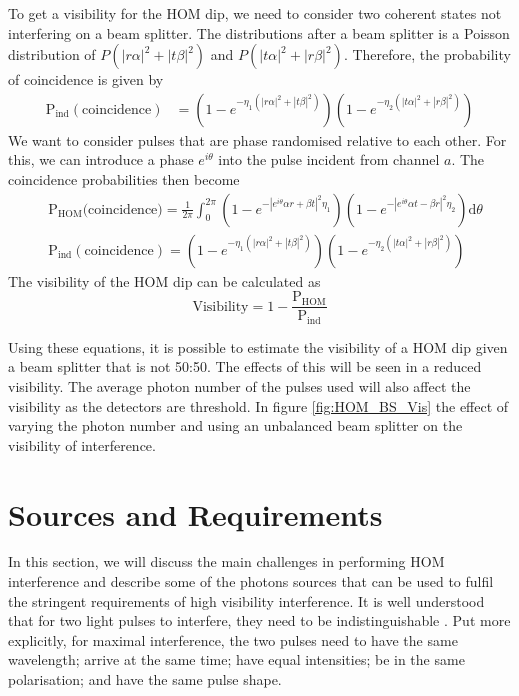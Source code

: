 To get a visibility for the HOM dip, we need to consider two coherent states not interfering on a beam splitter. The distributions after a beam splitter is a Poisson distribution of $P(|r\alpha|^2 + |t\beta|^2)$ and $P(|t\alpha|^2 + |r\beta|^2)$. Therefore, the probability of coincidence is given by
\begin{align}
	\text{P}_\text{ind}(\text{coincidence}) &= \left(1 - e^{-\eta_1(|r\alpha|^2 + |t\beta|^2)}\right)\left(1 - e^{-\eta_2(|t\alpha|^2 + |r\beta|^2)}\right)
\end{align}
We want to consider pulses that are phase randomised relative to each other. For this, we can introduce a phase $e^{i\theta}$ into the pulse incident from channel $a$. The coincidence probabilities then become
\begin{align}
	&\text{P}_\text{HOM}\text{(coincidence)} = \frac{1}{2\pi}\int_0^{2\pi}\left(1 - e^{-|e^{i\theta}\alpha r + \beta t|^2 \eta_1}\right)\left(1 - e^{-|e^{i\theta}\alpha t - \beta r|^2 \eta_2}\right)\text{d}\theta\\
	&\text{P}_\text{ind}(\text{coincidence}) = \left(1 - e^{-\eta_1(|r\alpha|^2 + |t\beta|^2)}\right)\left(1 - e^{-\eta_2(|t\alpha|^2 + |r\beta|^2)}\right)
\end{align}
The visibility of the HOM dip can be calculated as
\begin{equation}
	\text{Visibility} = 1 - \frac{\text{P}_\text{HOM}}{\text{P}_\text{ind}}
\end{equation}

Using these equations, it is possible to estimate the visibility of a HOM dip given a beam splitter that is not 50:50. The effects of this will be seen in a reduced visibility. The average photon number of the pulses used will also affect the visibility as the detectors are threshold. In figure \ref{fig:HOM_BS_Vis} the effect of varying the photon number and using an unbalanced beam splitter on the visibility of interference.

\section{Sources and Requirements}
\label{sec:sources}

In this section, we will discuss the main challenges in performing \ac{HOM} interference and describe some of the photons sources that can be used to fulfil the stringent requirements of high visibility interference. It is well understood that for two light pulses to interfere, they need to be indistinguishable \cite{}. Put more explicitly, for maximal interference, the two pulses need to have the same wavelength; arrive at the same time; have equal intensities; be in the same polarisation; and have the same pulse shape.

